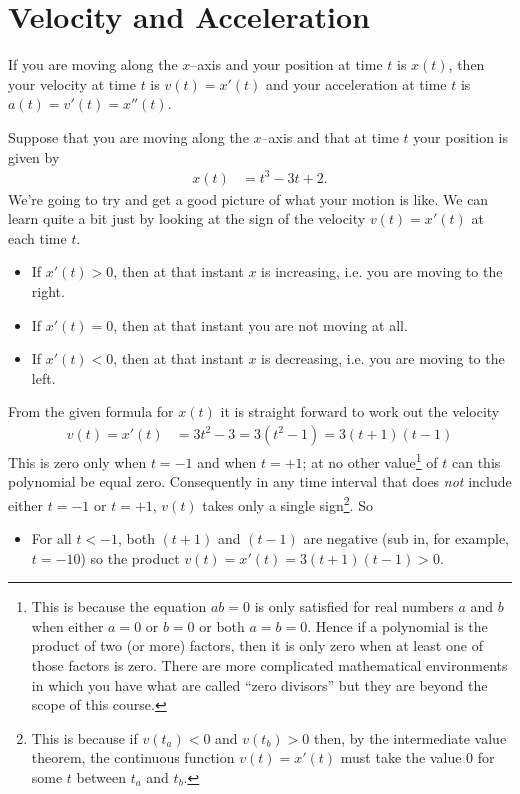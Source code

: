 \section{Velocity and Acceleration}\label{sec vel acc}

If you are moving along the $x$--axis and your position at time $t$
is $x(t)$, then your velocity at time $t$ is $v(t)=x'(t)$ and your
acceleration at time $t$ is $a(t)=v'(t) = x''(t)$.

\begin{eg}\label{eg:velaccelA}
Suppose that you are moving along the $x$--axis and that
at time $t$ your position is given by
\begin{align*}
x(t)&=t^3-3t+2.
\end{align*}
We're going to try and get a good picture of what your motion is like. We can learn quite
a bit just by looking at the sign of the velocity $v(t)=x'(t)$ at each time $t$.
\begin{itemize}
\item If $x'(t)>0$, then at that instant $x$ is increasing, i.e. you are
moving to the right.

\item If $x'(t)=0$, then at that instant you are not
moving at all.
\item If $x'(t)<0$, then at that instant $x$ is decreasing, i.e. you are
moving to the left.
\end{itemize}
From the given formula for $x(t)$ it is straight forward to work out the velocity
\begin{align*}
v(t) = x'(t) &=3t^2-3=3(t^2-1)=3(t+1)(t-1)
\end{align*}
This is zero only when $t=-1$ and when $t=+1$; at no other value\footnote{This is because
the equation $ab=0$ is only satisfied for real numbers $a$ and $b$ when either $a=0$ or
$b=0$ or both $a=b=0$. Hence if a polynomial is the product of two (or more) factors,
then it is only zero when at least one of those factors is zero. There are more
complicated mathematical environments in which you have what are called ``zero divisors''
but they are beyond the scope of this course.} of $t$ can this polynomial be equal zero.
Consequently in any time interval that does \emph{not} include either $t=-1$ or $t=+1$,
$v(t)$ takes only a single sign\footnote{This is because if $v(t_a)<0$ and $v(t_b)>0$
then, by the intermediate value theorem, the continuous function $v(t)=x'(t)$ must take
the value $0$ for some $t$ between $t_a$ and $t_b$.}. So
\begin{itemize}
\item For all $t<-1$, both $(t+1)$ and $(t-1)$ are negative (sub in,
for example, $t=-10$) so the product $v(t)=x'(t)=3(t+1)(t-1)>0$.


\end{itemize}
\end{eg}
